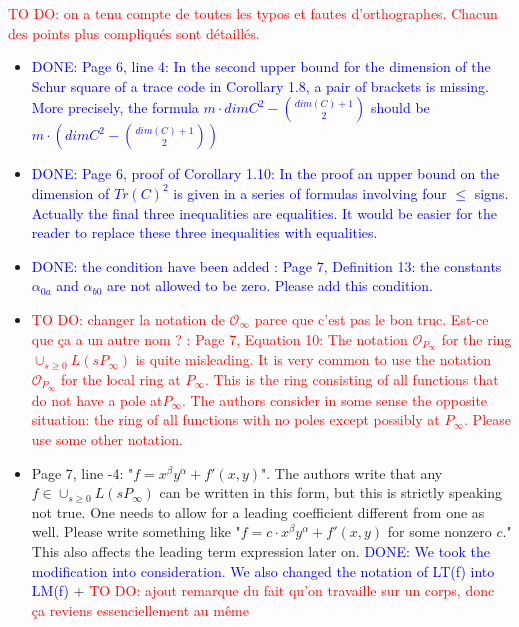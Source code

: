 \documentclass[12pt,a4paper]{amsart}
\newcommand\TODO[1]{\textcolor{red}{TO DO: #1}}
\newcommand\DONE[1]{\textcolor{blue}{DONE: #1}}
\begin{document}
\TODO{on a tenu compte de toutes les typos et fautes d'orthographes. Chacun des points plus compliqués sont détaillés.}

\begin{itemize}


\item \DONE{Page 6, line 4: In the second upper bound for the dimension of the Schur square of a trace code in Corollary 1.8, a pair of brackets is missing. More precisely, the formula $m \cdot dim C^2-\binom{dim(C)+1}{2}$ should be $m \cdot \left( dim C^2-\binom{dim(C)+1}{2}\right)$}

\item \DONE{Page 6, proof of Corollary 1.10: In the proof an upper bound on the dimension of $Tr(C)^2$ is given in a series of formulas involving four $\le$ signs. Actually the final three inequalities are equalities. It would be easier for the reader to replace these three inequalities with equalities.}


\item \DONE{the condition have been added : Page 7, Definition 13: the constants $\alpha_{0a}$ and $\alpha_{b0}$ are not allowed to be zero. Please add this condition.}

\item \TODO { changer la notation de $\mathcal{O}_\infty$ parce que c'est pas le bon truc. Est-ce que ça a un autre nom ? : Page 7, Equation 10: The notation $\mathcal{O}_{P_\infty}$ for the ring $\cup_{s \ge 0} L(sP_\infty)$ is quite misleading. It is very common to use the notation $\mathcal{O}_{P_\infty}$ for the local ring at $P_\infty$. This is the ring consisting of all functions that do not have a pole at$ P_\infty$. The authors consider in some sense the opposite situation: the ring of all functions with no poles except possibly at $P_\infty$. Please use some other notation.}


\item Page 7, line -4: "$f=x^\beta y^\alpha+f'(x,y)$". The authors write that any $f \in \cup_{s \ge 0} L(sP_\infty)$ can be written in this form, but this is strictly speaking not true. One needs to allow for a leading coefficient different from one as well. Please write something like "$f=c\cdot x^\beta y^\alpha+f'(x,y)$ for some nonzero $c$." This also affects the leading term expression later on.
\DONE{ We took the modification into consideration. We also changed the notation of LT(f) into LM(f)} + \TODO{ajout remarque du fait qu'on travaille sur un corps, donc ça reviens essenciellement au même}



\end{itemize}
\end{document}
